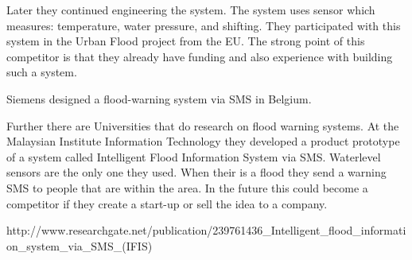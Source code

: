 Later they continued engineering the system. The system uses sensor which measures: temperature, water pressure, and shifting. They participated with this system in the Urban Flood project from the EU. The strong point of this competitor is that they already have funding and also experience with building such a system.

Siemens designed a flood-warning system via SMS in Belgium.

Further there are Universities that do research on flood warning systems. At the Malaysian Institute Information Technology they developed a product prototype of a system called Intelligent Flood Information System via SMS. Waterlevel sensors are the only one they used. When their is a flood they send a warning SMS to people that are within the area. In the future this could become a competitor if they create a start-up or sell the idea to a company.  

http://www.researchgate.net/publication/239761436_Intelligent_flood_information_system_via_SMS_(IFIS)

